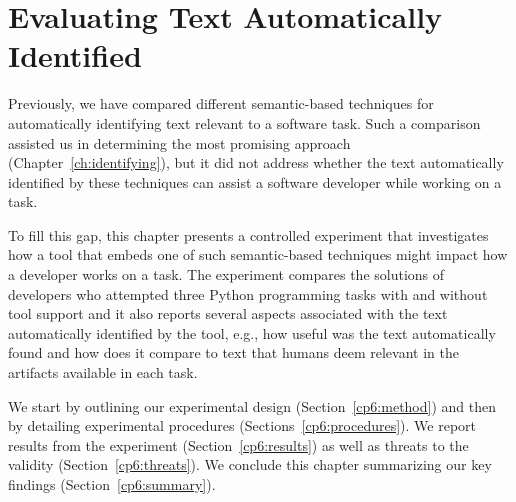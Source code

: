 \setcounter{chapter}{5}
\setcounter{rq}{1}


\chapter{Evaluating Text Automatically Identified}
\label{ch:assisting}




Previously, we have compared different semantic-based techniques for automatically identifying text relevant to a software task.
Such a comparison assisted us in determining the most promising approach (Chapter~\ref{ch:identifying}), but it did not address whether 
the text automatically identified  
by these techniques can assist a software developer while working on a task.



To fill this gap, this chapter presents a controlled experiment that 
investigates how a tool that embeds one of such semantic-based techniques 
might impact how a developer works on a task. 
The experiment 
compares the solutions of developers who attempted three Python programming tasks with and without tool support
and it also reports several aspects associated with the text automatically identified by the tool,
e.g., how useful was the text automatically found and how does it compare to text that humans deem relevant
in the artifacts available in each task.





We start by outlining our experimental design (Section~\ref{cp6:method}) and then 
by detailing experimental procedures (Sections~\ref{cp6:procedures}).
We report results from the experiment (Section~\ref{cp6:results})
as well as threats to the validity (Section~\ref{cp6:threats}).
We conclude this chapter summarizing our key findings (Section~\ref{cp6:summary}).


\clearpage






















% 

